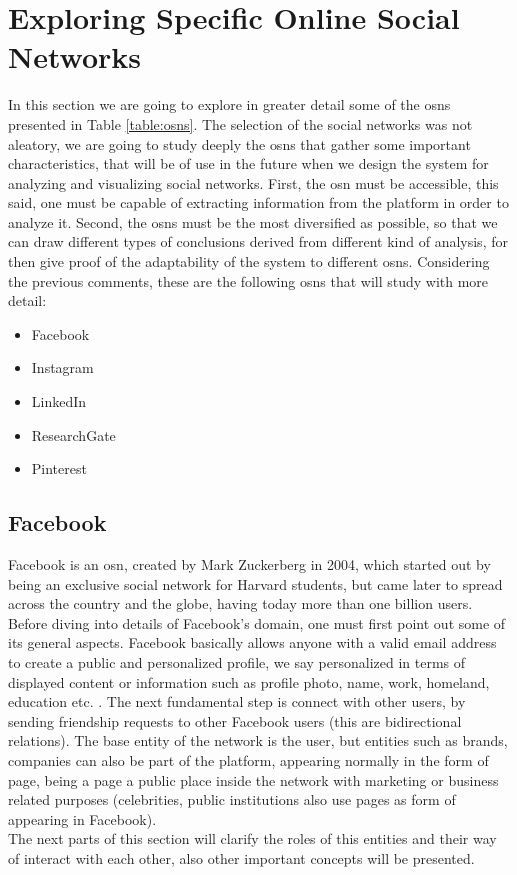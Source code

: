 \section{Exploring Specific Online Social Networks}

In this section we are going to explore in greater detail some of the \glspl{osn} presented
in Table \ref{table:osns}. The selection of the social networks was not aleatory, we are going
to study deeply the \glspl{osn} that gather some important characteristics, that will be of use in
the future when we design the system for analyzing and visualizing social networks. First, the
\gls{osn} must be accessible, this said, one must be capable of extracting information from the platform
in order to analyze it. Second, the \glspl{osn} must be the most diversified as possible, so that we
can draw different types of conclusions derived from different kind of analysis, for then give proof
of the adaptability of the system to different \glspl{osn}. Considering the previous
comments, these are the following \glspl{osn} that will study with more detail:
\begin{itemize}
  \item Facebook
  \item Instagram
  \item LinkedIn
  \item ResearchGate
  \item Pinterest
\end{itemize}

\subsection{Facebook}

Facebook is an \gls{osn}, created by Mark Zuckerberg in 2004, which started out by being an exclusive social network for Harvard students, but came later to spread across
the country and the globe, having today more than one billion users.\\
\indent Before diving into details of Facebook's domain, one must first point out some of its general aspects. Facebook basically allows anyone with a valid email address to create a public and personalized profile,
we say personalized in terms of displayed content or information such as profile photo, name, work, homeland, education etc. .
The next fundamental step is connect with other users, by sending friendship requests to other Facebook users (this are bidirectional relations).
The base entity of the network is the user, but entities such as brands, companies can also be part of the platform, appearing normally
in the form of page, being a page a public place inside the network with marketing or business related purposes (celebrities, public institutions also use pages as form of appearing in Facebook).\\
\indent The next parts of this section will clarify the roles of this entities and their way of interact with each other, also other important concepts will be presented.

